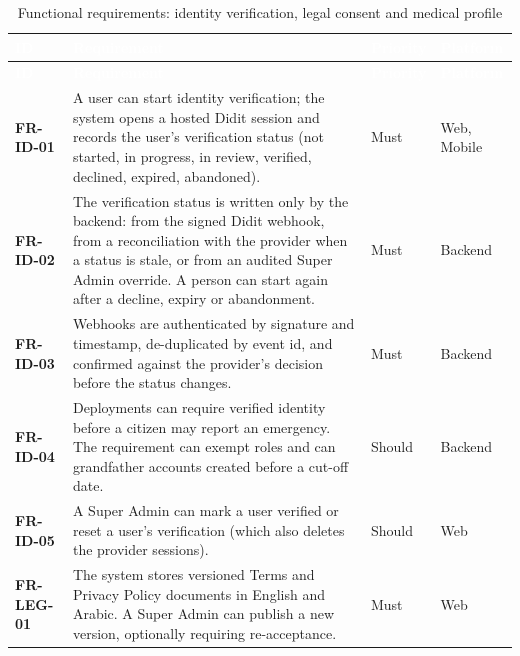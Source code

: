 {\tabfont\rowband
\begin{longtable}{@{}>{\raggedright\arraybackslash}p{}>{\raggedright\arraybackslash}p{}>{\raggedright\arraybackslash}p{}>{\raggedright\arraybackslash}p{}@{}}
\caption{Functional requirements: identity verification, legal consent and medical profile}\label{tab:fr-id}\\
\rowcolor{najdanavy}\textcolor{white}{\sffamily\bfseries\small ID} & \textcolor{white}{\sffamily\bfseries\small Requirement} & \textcolor{white}{\sffamily\bfseries\small Priority} & \textcolor{white}{\sffamily\bfseries\small Platform}\\
\endfirsthead
\rowcolor{najdanavy}\textcolor{white}{\sffamily\bfseries\small ID} & \textcolor{white}{\sffamily\bfseries\small Requirement} & \textcolor{white}{\sffamily\bfseries\small Priority} & \textcolor{white}{\sffamily\bfseries\small Platform}\\
\endhead
\bottomrule\endlastfoot
\textbf{FR-ID-01} & A user can start identity verification; the system opens a hosted Didit session and records the user’s verification status (not started, in progress, in review, verified, declined, expired, abandoned). & Must & Web, Mobile\\
\textbf{FR-ID-02} & The verification status is written only by the backend: from the signed Didit webhook, from a reconciliation with the provider when a status is stale, or from an audited Super Admin override. A person can start again after a decline, expiry or abandonment. & Must & Backend\\
\textbf{FR-ID-03} & Webhooks are authenticated by signature and timestamp, de-duplicated by event id, and confirmed against the provider’s decision before the status changes. & Must & Backend\\
\textbf{FR-ID-04} & Deployments can require verified identity before a citizen may report an emergency. The requirement can exempt roles and can grandfather accounts created before a cut-off date. & Should & Backend\\
\textbf{FR-ID-05} & A Super Admin can mark a user verified or reset a user’s verification (which also deletes the provider sessions). & Should & Web\\
\textbf{FR-LEG-01} & The system stores versioned Terms and Privacy Policy documents in English and Arabic. A Super Admin can publish a new version, optionally requiring re-acceptance. & Must & Web\\

\end{longtable}}
